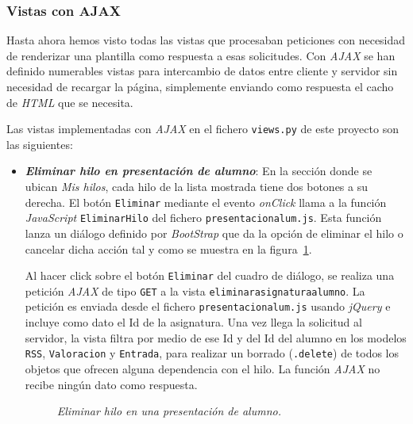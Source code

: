 \documentclass[a4paper, 12pt]{book}
\begin{document}
\subsubsection{Vistas con AJAX} 
\label{sec:vistasajax}
Hasta ahora hemos visto todas las vistas que procesaban peticiones con necesidad de renderizar una plantilla como respuesta a esas solicitudes. Con 
\textit{AJAX} se han definido numerables vistas para intercambio de datos entre cliente y servidor sin necesidad de recargar la p\'agina, simplemente 
enviando como respuesta el cacho de \textit{HTML} que se necesita.

Las vistas implementadas con \textit{AJAX} en el fichero \texttt{views.py} de este proyecto son las siguientes:

\begin{itemize}
  \item {\bfseries \textit{Eliminar hilo en presentaci\'on de alumno}}: En la secci\'on donde se ubican \textit{Mis hilos}, cada hilo de la lista mostrada 
  tiene dos botones a su derecha. El bot\'on \texttt{Eliminar} mediante el evento \textit{onClick} llama a la funci\'on \textit{JavaScript} 
  \texttt{EliminarHilo} del fichero \texttt{presentacionalum.js}. Esta funci\'on lanza un di\'alogo definido por \textit{BootStrap} que da la opci\'on de
  eliminar el hilo o cancelar dicha acci\'on tal y como se muestra en la figura~\ref{fig:eliminarhiloalumno}. 
  
  Al hacer click sobre el bot\'on \texttt{Eliminar} del cuadro de di\'alogo, se realiza una petici\'on \textit{AJAX} de tipo \texttt{GET} a la vista 
  \texttt{eliminarasignaturaalumno}. La petici\'on es enviada desde el fichero \texttt{presentacionalum.js} usando \textit{jQuery} e incluye como dato el 
  Id de la asignatura. Una vez llega la solicitud al servidor, la vista filtra por medio de ese Id y del Id del alumno en los modelos \texttt{RSS}, 
  \texttt{Valoracion} y \texttt{Entrada}, para realizar un borrado (\texttt{.delete}) de todos los objetos que ofrecen alguna dependencia con el hilo. La 
  funci\'on \textit{AJAX} no recibe ning\'un dato como respuesta.
  
  \begin{figure}
    \centering
    \caption{\textit{Eliminar hilo en una presentaci\'on de alumno.}}
    \label{fig:eliminarhiloalumno}
  \end{figure}


\end{itemize}
\end{document}
